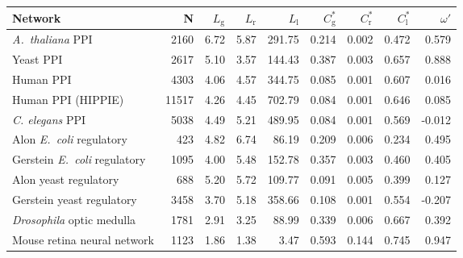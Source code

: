 \begin{tabular}{lrrrrrrrr}
\hline
Network & N  & $L_{\mathrm{g}}$ & $L_{\mathrm{r}}$ & $L_{\mathrm{l}}$ & $C^\ast_{\mathrm{g}}$ & $C^\ast_{\mathrm{r}}$ & $C^\ast_{\mathrm{l}}$ &  $\omega'$ \\
\hline
\textit{A.~thaliana} PPI & 2160 & 6.72 & 5.87 & 291.75 & 0.214 & 0.002 & 0.472 & 0.579\\
Yeast PPI & 2617 & 5.10 & 3.57 & 144.43 & 0.387 & 0.003 & 0.657 & 0.888\\
Human PPI & 4303 & 4.06 & 4.57 & 344.75 & 0.085 & 0.001 & 0.607 & 0.016\\
Human PPI (HIPPIE) & 11517 & 4.26 & 4.45 & 702.79 & 0.084 & 0.001 & 0.646 & 0.085\\
\textit{C. elegans} PPI & 5038 & 4.49 & 5.21 & 489.95 & 0.084 & 0.001 & 0.569 & -0.012\\
Alon \textit{E.~coli} regulatory & 423 & 4.82 & 6.74 & 86.19 & 0.209 & 0.006 & 0.234 & 0.495\\
Gerstein \textit{E.~coli} regulatory & 1095 & 4.00 & 5.48 & 152.78 & 0.357 & 0.003 & 0.460 & 0.405\\
Alon yeast regulatory & 688 & 5.20 & 5.72 & 109.77 & 0.091 & 0.005 & 0.399 & 0.127\\
Gerstein yeast regulatory & 3458 & 3.70 & 5.18 & 358.66 & 0.108 & 0.001 & 0.554 & -0.207\\
\textit{Drosophila} optic medulla & 1781 & 2.91 & 3.25 & 88.99 & 0.339 & 0.006 & 0.667 & 0.392\\
Mouse retina neural network & 1123 & 1.86 & 1.38 & 3.47 & 0.593 & 0.144 & 0.745 & 0.947\\
\hline
\end{tabular}
